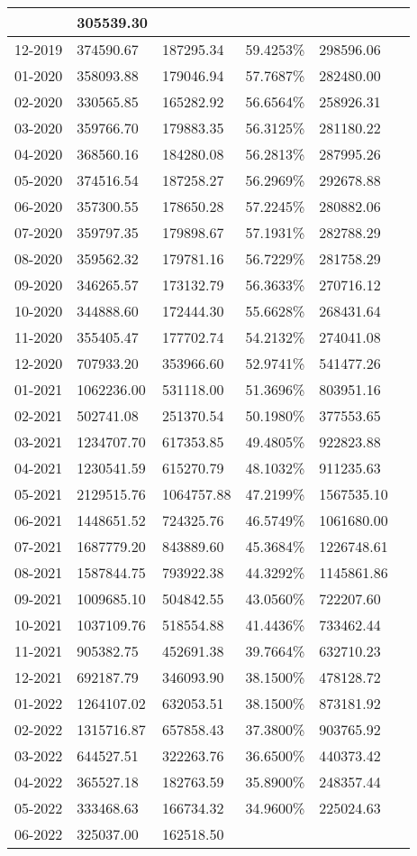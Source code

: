 \documentclass{report}
\begin{document}
\begin{longtable}[c]{|p{1.7cm}|p{2.6cm}|p{2.6cm}|p{2.3cm}|p{2.3cm}|c|}
& 305539.30\\ \hline12-2019 & 374590.67 & 187295.34 & 59.4253\% & 298596.06\\ \hline01-2020 & 358093.88 & 179046.94 & 57.7687\% & 282480.00\\ \hline02-2020 & 330565.85 & 165282.92 & 56.6564\% & 258926.31\\ \hline03-2020 & 359766.70 & 179883.35 & 56.3125\% & 281180.22\\ \hline04-2020 & 368560.16 & 184280.08 & 56.2813\% & 287995.26\\ \hline05-2020 & 374516.54 & 187258.27 & 56.2969\% & 292678.88\\ \hline06-2020 & 357300.55 & 178650.28 & 57.2245\% & 280882.06\\ \hline07-2020 & 359797.35 & 179898.67 & 57.1931\% & 282788.29\\ \hline08-2020 & 359562.32 & 179781.16 & 56.7229\% & 281758.29\\ \hline09-2020 & 346265.57 & 173132.79 & 56.3633\% & 270716.12\\ \hline10-2020 & 344888.60 & 172444.30 & 55.6628\% & 268431.64\\ \hline11-2020 & 355405.47 & 177702.74 & 54.2132\% & 274041.08\\ \hline12-2020 & 707933.20 & 353966.60 & 52.9741\% & 541477.26\\ \hline01-2021 & 1062236.00 & 531118.00 & 51.3696\% & 803951.16\\ \hline02-2021 & 502741.08 & 251370.54 & 50.1980\% & 377553.65\\ \hline03-2021 & 1234707.70 & 617353.85 & 49.4805\% & 922823.88\\ \hline04-2021 & 1230541.59 & 615270.79 & 48.1032\% & 911235.63\\ \hline05-2021 & 2129515.76 & 1064757.88 & 47.2199\% & 1567535.10\\ \hline06-2021 & 1448651.52 & 724325.76 & 46.5749\% & 1061680.00\\ \hline07-2021 & 1687779.20 & 843889.60 & 45.3684\% & 1226748.61\\ \hline08-2021 & 1587844.75 & 793922.38 & 44.3292\% & 1145861.86\\ \hline09-2021 & 1009685.10 & 504842.55 & 43.0560\% & 722207.60\\ \hline10-2021 & 1037109.76 & 518554.88 & 41.4436\% & 733462.44\\ \hline11-2021 & 905382.75 & 452691.38 & 39.7664\% & 632710.23\\ \hline12-2021 & 692187.79 & 346093.90 & 38.1500\% & 478128.72\\ \hline01-2022 & 1264107.02 & 632053.51 & 38.1500\% & 873181.92\\ \hline02-2022 & 1315716.87 & 657858.43 & 37.3800\% & 903765.92\\ \hline03-2022 & 644527.51 & 322263.76 & 36.6500\% & 440373.42\\ \hline04-2022 & 365527.18 & 182763.59 & 35.8900\% & 248357.44\\ \hline05-2022 & 333468.63 & 166734.32 & 34.9600\% & 225024.63\\ \hline06-2022 & 325037.00 & 162518.50 & 
\end{longtable}
\end{document}
